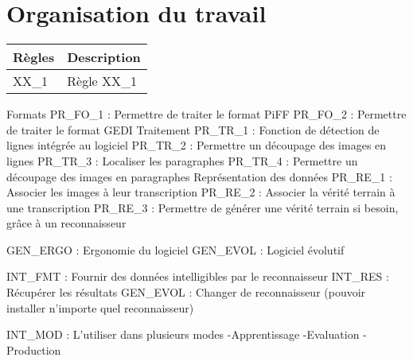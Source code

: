 \section{Organisation du travail}

\begin{mdframed}[frametitle={Figure N : LOT 1 - X}, innerbottommargin=10]
\begin{center}
\begin{tabular}{ | l | l | }
\hline
{\textbf{Règles}}   &   {\textbf{Description}} \\ \hline
{XX\_1}              &   {Règle XX\_1} \\ \hline
\end{tabular}
\end{center}
\end{mdframed}

Formats
PR\_FO\_1 : Permettre de traiter le format PiFF
PR\_FO\_2 : Permettre de traiter le format GEDI
Traitement
PR\_TR\_1 : Fonction de détection de lignes intégrée au logiciel
PR\_TR\_2 : Permettre un découpage des images en lignes
PR\_TR\_3 : Localiser les paragraphes
PR\_TR\_4 : Permettre un découpage des images en paragraphes
Représentation des données
PR\_RE\_1 : Associer les images à leur transcription
PR\_RE\_2 : Associer la vérité terrain à une transcription
PR\_RE\_3 : Permettre de générer une vérité terrain si besoin, grâce à un reconnaisseur

GEN\_ERGO : Ergonomie du logiciel
GEN\_EVOL : Logiciel évolutif

INT_FMT : Fournir des données intelligibles par le reconnaisseur
INT_RES : Récupérer les résultats
GEN_EVOL : Changer de reconnaisseur (pouvoir installer n’importe quel reconnaisseur)

INT_MOD : L’utiliser dans plusieurs modes
-Apprentissage
-Evaluation
-Production